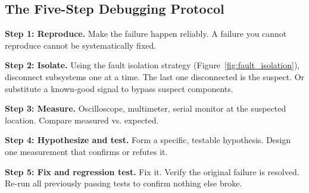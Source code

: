 \subsection{The Five-Step Debugging Protocol}
\textbf{Step 1: Reproduce.} Make the failure happen reliably. A failure you cannot reproduce cannot be systematically fixed.

\textbf{Step 2: Isolate.} Using the fault isolation strategy (Figure~\ref{fig:fault_isolation}), disconnect subsystems one at a time. The last one disconnected is the suspect. Or substitute a known-good signal to bypass suspect components.

\textbf{Step 3: Measure.} Oscilloscope, multimeter, serial monitor at the suspected location. Compare measured vs. expected.

\textbf{Step 4: Hypothesize and test.} Form a specific, testable hypothesis. Design one measurement that confirms or refutes it.

\textbf{Step 5: Fix and regression test.} Fix it. Verify the original failure is resolved. Re-run all previously passing tests to confirm nothing else broke.

